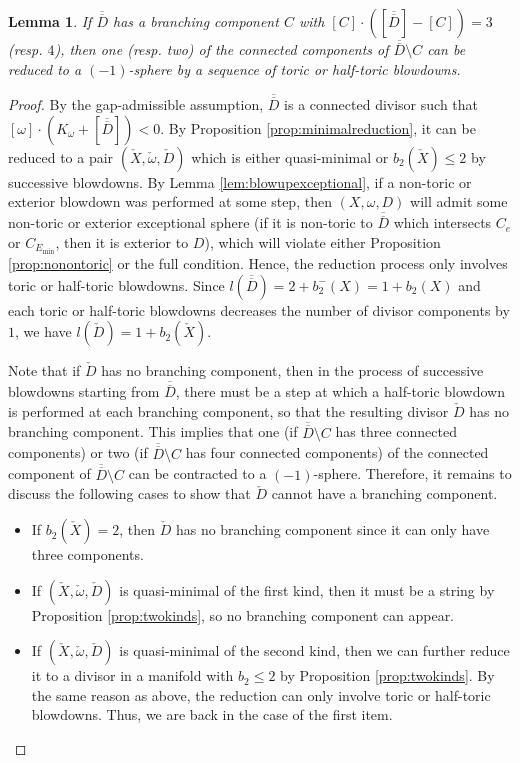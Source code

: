 \documentclass[11pt]{article}
\newtheorem{lemma}[theorem]{Lemma}
\theoremstyle{definition}
\theoremstyle{remark}
\begin{document}
\begin{lemma}\label{lem:-1reduction}
  If $\overline{\overline{D}}$ has a branching component $C$ with $[C]\cdot([\overline{\overline{D}}]-[C])= 3$ (resp. $4$), then one (resp. two) of the connected components of $\overline{\overline{D}}\setminus C$ can be reduced to a $(-1)$-sphere by a sequence of toric or half-toric blowdowns.
\end{lemma}
\begin{proof}
  By the gap-admissible assumption, $\overline{\overline{D}}$ is a connected divisor such that $[\omega]\cdot(K_{\omega}+[\overline{\overline{D}}])<0$. By Proposition \ref{prop:minimalreduction}, it can be reduced to a pair $(\check{X},\check{\omega},\check{D})$ which is either quasi-minimal or $b_2(\check{X})\leq 2$ by successive blowdowns. By Lemma \ref{lem:blowupexceptional}, if a non-toric or exterior blowdown was performed at some step, then $(X,\omega,D)$ will admit some non-toric or exterior exceptional sphere (if it is non-toric to $\overline{\overline{D}}$ which intersects $C_e$ or $C_{E_{\text{min}}}$, then it is exterior to $D$), which will violate either Proposition \ref{prop:nonontoric} or the full condition. Hence, the reduction process only involves toric or half-toric blowdowns. Since $l(\overline{\overline{D}})=2+b_2^-(X)=1+b_2(X)$ and each toric or half-toric blowdowns decreases the number of divisor components by $1$, we have $l(\check{D})=1+b_2(\check{X})$.
  
  Note that if $\check{D}$ has no branching component, then in the process of successive blowdowns starting from $\overline{\overline{D}}$, there must be a step at which a half-toric blowdown is performed at each branching component, so that the resulting divisor $\check{D}$ has no branching component. This implies that one (if $\overline{\overline{D}}\setminus C$ has three connected components) or two (if $\overline{\overline{D}}\setminus C$ has four connected components) of the connected component of $\overline{\overline{D}}\setminus C$ can be contracted to a $(-1)$-sphere. Therefore, it remains to discuss the following cases to show that $\check{D}$ cannot have a branching component.
  \begin{itemize}[nosep]
    \item If $b_2(\check{X})=2$, then $\check{D}$ has no branching component since it can only have three components. 
    \item If $(\check{X},\check{\omega},\check{D})$ is quasi-minimal of the first kind, then it must be a string by Proposition \ref{prop:twokinds}, so no branching component can appear.
    \item If $(\check{X},\check{\omega},\check{D})$ is quasi-minimal of the second kind, then we can further reduce it to a divisor in a manifold with $b_2\leq 2$ by Proposition \ref{prop:twokinds}. By the same reason as above, the reduction can only involve toric or half-toric blowdowns. Thus, we are back in the case of the first item.

  \end{itemize}

\end{proof}
\end{document}
